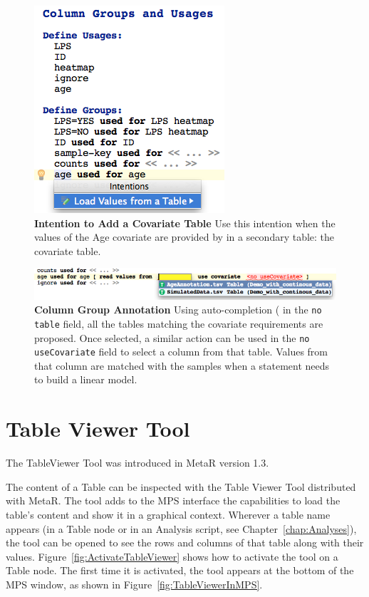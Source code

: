 \begin{figure}
\centering
  \includegraphics[width=\figWidthSmall]{figures/IntentionForAddingCovariateTable.png}
\caption[Intention to add a Covariate Table]{\textbf{Intention to Add a Covariate Table} Use this intention when the values of the Age covariate are provided by in a secondary table: the covariate table.}
\label{fig:AddCovariateTable}
\end{figure}

\begin{figure}[h!tbp]
\centering
  \includegraphics[width=\figWidthWide]{figures/GroupAnnotation.png}
\caption[Column Group Annotation]{\textbf{Column Group Annotation} Using auto-completion (\keys{\ctrl+\space} in the \texttt{no table} field, all the tables matching the covariate requirements are proposed. Once selected, a similar action can be used in the  \texttt{no useCovariate} field to select a column from that table. Values from that column are matched with the samples when a statement needs to build a linear model.}
\label{fig:GroupAnnotation}
\end{figure}

\section{Table Viewer Tool}\label{sec:TableViewerTool}
\begin{remark}
The TableViewer Tool was introduced in MetaR version 1.3.
\end{remark}

The content of a Table can be inspected with the Table Viewer Tool distributed with MetaR. The tool adds to the MPS interface the capabilities to load the table's content and show it in a graphical context.
Wherever a table name appears (in a Table node or in an Analysis script, see Chapter~\ref{chap:Analyses}), the tool can be opened to see the rows and columns of that table along with their values. Figure~\ref{fig:ActivateTableViewer} shows how to activate the tool on a Table node. The first time it is activated, the tool appears at the bottom of the MPS window, as shown in Figure~\ref{fig:TableViewerInMPS}.

